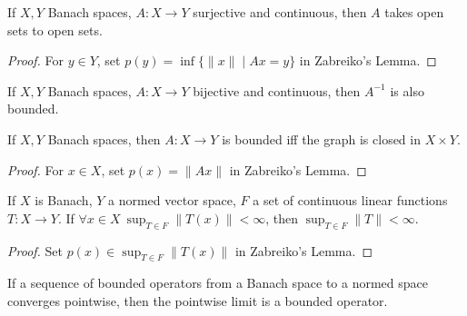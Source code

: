 \documentclass[letterpaper,11pt]{report}
\begin{document}
\begin{thm} If $X,Y$ Banach spaces, $A:X\rightarrow Y$ surjective and continuous, then $A$ takes open sets to open sets.
\end{thm}
\begin{proof} For $y \in Y$, set $p(y) = \inf \{\|x\| \mid Ax = y\}$ in Zabreiko's Lemma.
\end{proof}

\begin{thm} If $X,Y$ Banach spaces, $A:X\rightarrow Y$ bijective and continuous, then $A^{-1}$ is also bounded.
\end{thm}

\begin{thm} If $X, Y$ Banach spaces, then $A:X\rightarrow Y$ is bounded iff the graph is closed in $X\times Y$.
\end{thm}
\begin{proof} For $x \in X$, set $p(x) = \|Ax\|$ in Zabreiko's Lemma.
\end{proof}

\begin{thm} If $X$ is Banach, $Y$ a normed vector space, $F$ a set of continuous linear functions $T:X\rightarrow Y$. If $\forall x \in X\ \sup_{T\in F} \|T(x)\| < \infty$, then $\sup_{T \in F} \|T\| < \infty$.
\end{thm}
\begin{proof} Set $p(x) \in \sup_{T\in F} \|T(x)\|$ in Zabreiko's Lemma.
\end{proof}

\begin{cor} If a sequence of bounded operators from a Banach space to a normed space converges pointwise, then the pointwise limit is a bounded operator.
\end{cor}




\end{document}
